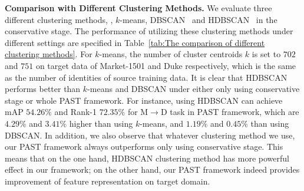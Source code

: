 \documentclass[10pt,twocolumn,letterpaper]{article}
\begin{document}
\textbf{Comparison with Different Clustering Methods.} We evaluate three different clustering methods, \ie,  $k$-means, DBSCAN~\cite{DBSCAN} and HDBSCAN~\cite{HDBSCAN} in the conservative stage. The performance of utilizing these clustering methods under different settings are specified in Table~\ref{tab:The comparison of different clustering methods}. For $k$-means, the number of cluster centroids $k$ is set to $702$ and $751$ on target data of Market-1501 and Duke respectively, which is the same as the number of identities of source training data.
It is clear that HDBSCAN performs better than $k$-means and DBSCAN under either only using conservative stage or whole PAST framework. For instance, using HDBSCAN can achieve mAP $54.26\%$ and Rank-1 $72.35\%$ for M$\rightarrow$D task in PAST framework, which are $4.29\%$ and $3.41\%$ higher than using $k$-means, and $1.19\%$ and $0.45\%$ than using DBSCAN. In addition, we also observe that whatever clustering method we use, our PAST framework always outperforms only using conservative stage. This means that on the one hand, HDBSCAN clustering method has more powerful effect in our framework; on the other hand, our PAST framework indeed provides improvement of feature representation on target domain.
\end{document}
